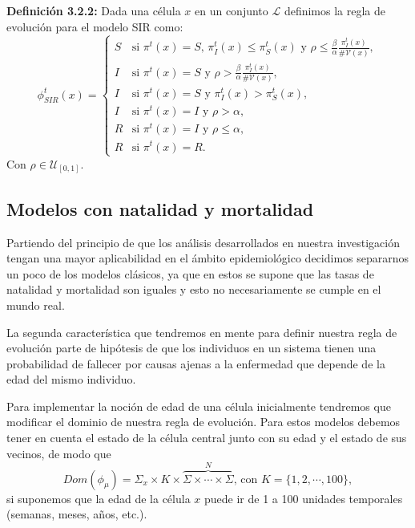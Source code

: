 \textbf{Definición 3.2.2:} Dada una célula $x$ en un conjunto $\mathcal{L}$ definimos la regla de evolución para el modelo SIR como:
\begin{equation}
    \phi_{SIR}^t(x)=\left\{\begin{array}{ll}
        S & \text{si }\pi^t(x)=S\text{, }\pi_I^t(x)\leq\pi_S^t(x)\text{ y }\rho\leq\frac{\beta}{\alpha}\frac{\pi_I^t(x)}{\#\mathcal{V}(x)}, \\
        I & \text{si }\pi^t(x)=S\text{ y }\rho>\frac{\beta}{\alpha}\frac{\pi_I^t(x)}{\#\mathcal{V}(x)}, \\
        I & \text{si }\pi^t(x)=S\text{ y }\pi_I^t(x)>\pi_S^t(x), \\
        I & \text{si }\pi^t(x)=I\text{ y }\rho>\alpha,\\
        R & \text{si }\pi^t(x)=I\text{ y }\rho\leq\alpha, \\
        R & \text{si }\pi^t(x)=R.
    \end{array}\right.
\end{equation}
Con $\rho\in\mathcal{U}_{[0,1]}$.
\subsection{Modelos con natalidad y mortalidad}
Partiendo del principio de que los análisis desarrollados en nuestra investigación tengan una mayor aplicabilidad en el ámbito epidemiológico decidimos separarnos un poco de los modelos clásicos, ya que en estos se supone que las tasas de natalidad y mortalidad son iguales y esto no necesariamente se cumple en el mundo real.

La segunda característica que tendremos en mente para definir nuestra regla de evolución parte de hipótesis de que los individuos en un sistema tienen una probabilidad de fallecer por causas ajenas a la enfermedad que depende de la edad del mismo individuo.

Para implementar la noción de edad de una célula inicialmente tendremos que modificar el dominio de nuestra regla de evolución. Para estos modelos debemos tener en cuenta el estado de la célula central junto con su edad y el estado de sus vecinos, de modo que 
$$Dom(\phi_\mu)=\Sigma_x\times K\times\overbrace{\Sigma\times\cdots\times\Sigma}^N\text{, con }K=\{1,2,\cdots,100\},$$
si suponemos que la edad de la célula $x$ puede ir de 1 a 100 unidades temporales (semanas, meses, años, etc.).


